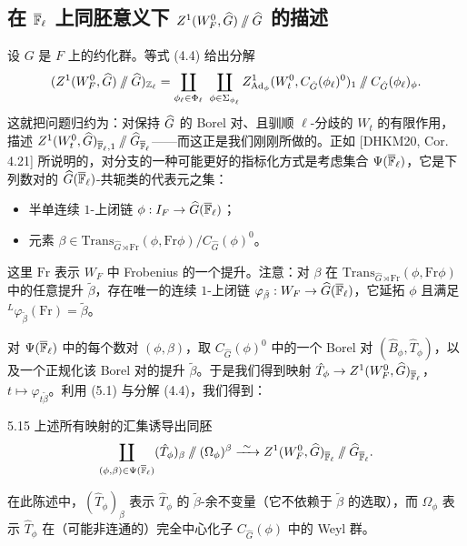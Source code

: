 \subsection{在 $\overline{\mathbb{F}}_\ell$ 上同胚意义下 $Z^1(W_F^0,\widehat{G})\sslash\widehat{G}$ 的描述}
设 $G$ 是 $F$ 上的约化群。等式 (4.4) 给出分解
\[
(Z^1(W_F^0,\widehat{G})\sslash\widehat{G})_{\mathbb{Z}_\ell}
=\coprod_{\phi_\ell\in\Phi_\ell}\ \coprod_{\phi\in\Sigma_{\phi_\ell}}
Z^1_{\mathrm{Ad}_\phi}(W_t^0,C_{\hat G}(\phi_\ell)^0)_1\sslash C_{\hat G}(\phi_\ell)_\phi.
\]
这就把问题归约为：对保持 $\widehat{G}$ 的 Borel 对、且驯顺 $\ell$-分歧的 $W_t$ 的有限作用，描述 $Z^1(W_t^0,\widehat{G})_{\overline{\mathbb{F}}_\ell,1}\sslash\widehat{G}_{\overline{\mathbb{F}}_\ell}$——而这正是我们刚刚所做的。正如 [DHKM20, Cor. 4.21] 所说明的，对分支的一种可能更好的指标化方式是考虑集合 $\Psi(\overline{\mathbb{F}}_\ell)$，它是下列数对的 $\widehat{G}(\overline{\mathbb{F}}_\ell)$-共轭类的代表元之集：
\begin{itemize}[leftmargin=1.8em,itemsep=0.1em]
\item 半单连续 $1$-上闭链 $\phi:I_F\to\widehat{G}(\overline{\mathbb{F}}_\ell)$；
\item 元素 $\beta\in\mathrm{Trans}_{\hat G\rtimes\mathrm{Fr}}(\phi,\mathrm{Fr}\phi)/C_{\hat G}(\phi)^0$。
\end{itemize}
这里 $\mathrm{Fr}$ 表示 $W_F$ 中 Frobenius 的一个提升。注意：对 $\beta$ 在 $\mathrm{Trans}_{\hat G\rtimes\mathrm{Fr}}(\phi,\mathrm{Fr}\phi)$ 中的任意提升 $\tilde\beta$，存在唯一的连续 $1$-上闭链 $\varphi_{\tilde\beta}:W_F\to\widehat{G}(\overline{\mathbb{F}}_\ell)$，它延拓 $\phi$ 且满足 ${}^L\varphi_{\tilde\beta}(\mathrm{Fr})=\tilde\beta$。

对 $\Psi(\overline{\mathbb{F}}_\ell)$ 中的每个数对 $(\phi,\beta)$，取 $C_{\hat G}(\phi)^0$ 中的一个 Borel 对 $(\hat B_\phi,\hat T_\phi)$，以及一个正规化该 Borel 对的提升 $\tilde\beta$。于是我们得到映射 $\hat T_\phi\to Z^1(W_F^0,\widehat{G})_{\overline{\mathbb{F}}_\ell}$，$t\mapsto\varphi_{t\tilde\beta}$。利用 (5.1) 与分解 (4.4)，我们得到：

\begin{thm}{5.15}
上述所有映射的汇集诱导出同胚
\[
\coprod_{(\phi,\beta)\in\Psi(\overline{\F}_\ell)}(\hat T_\phi)_\beta\sslash(\Omega_\phi)^\beta
\xrightarrow{\ \sim\ }Z^1(W_F^0,\hatG)_{\overline{\F}_\ell}\sslash\hatG_{\overline{\F}_\ell}.
\]
\end{thm}

在此陈述中，$(\hat T_\phi)_\beta$ 表示 $\hat T_\phi$ 的 $\tilde\beta$-余不变量（它不依赖于 $\tilde\beta$ 的选取），而 $\Omega_\phi$ 表示 $\hat T_\phi$ 在（可能非连通的）完全中心化子 $C_{\hat G}(\phi)$ 中的 Weyl 群。

